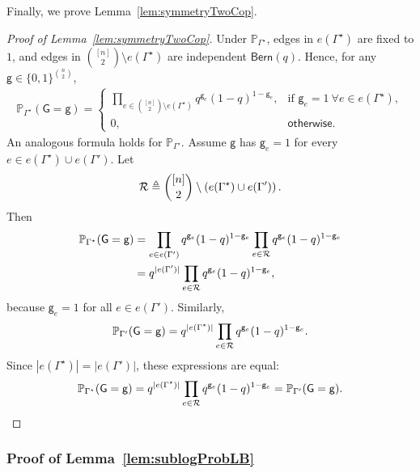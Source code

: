 \documentclass[12pt]{article}
\newcommand {\pr} {\mathbb{P}}
\newcommand{\calR}{{\cal R}}
\newcommand{\p}[1]{\left(#1\right)}
\newcommand{\s}[1]{\mathsf{#1}}
\begin{document}
Finally, we prove Lemma~\ref{lem:symmetryTwoCop}.
\begin{proof}[Proof of Lemma~\ref{lem:symmetryTwoCop}]
Under $\pr_{\Gamma^\star}$, edges in $e(\Gamma^\star)$ are fixed to $1$, and edges in $\binom{[n]}{2}\setminus e(\Gamma^\star)$ are independent $\s{Bern}(q)$. Hence, for any $\s{g}\in\{0,1\}^{\binom{n}{2}}$,
\begin{align}
\pr_{\Gamma^\star}(\s{G}=\s{g})=
\begin{cases}
\prod_{e\in \binom{[n]}{2}\setminus e(\Gamma^\star)} q^{\s{g}_e}(1-q)^{1-\s{g}_e}, & \text{if } \s{g}_e=1\ \forall e\in e(\Gamma^\star),\\
0, & \s{otherwise.}
\end{cases}
\end{align}
An analogous formula holds for $\pr_{\Gamma'}$. Assume $\s{g}$ has $\s{g}_e=1$ for every $e\in e(\Gamma^\star)\cup e(\Gamma')$. Let
\begin{align}
\calR \triangleq \binom{[n]}{2}\setminus\p{e(\Gamma^\star)\cup e(\Gamma')}.
\end{align}
Then
\begin{align}
\pr_{\Gamma^\star}(\s{G}=\s{g})
&= \prod_{e\in e(\Gamma')} q^{\s{g}_e}(1-q)^{1-\s{g}_e}\prod_{e\in \calR} q^{\s{g}_e}(1-q)^{1-\s{g}_e}\\
&= q^{|e(\Gamma')|}\prod_{e\in \calR}q^{\s{g}_e}(1-q)^{1-\s{g}_e},
\end{align}
because $\s{g}_e=1$ for all $e\in e(\Gamma')$. Similarly,
\begin{align}
\pr_{\Gamma'}(\s{G}=\s{g})
= q^{|e(\Gamma^\star)|}\prod_{e\in \calR}q^{\s{g}_e}(1-q)^{1-\s{g}_e}.
\end{align}
Since $|e(\Gamma^\star)|=|e(\Gamma')|$, these expressions are equal:
\begin{align}
\pr_{\Gamma^\star}(\s{G}=\s{g})=q^{|e(\Gamma^\star)|}\prod_{e\in\calR} q^{\s{g}_e}(1-q)^{1-\s{g}_e}
=\pr_{\Gamma'}(\s{G}=\s{g}).
\end{align}
\end{proof}

\subsubsection{Proof of Lemma~\ref{lem:sublogProbLB}}\label{app:GeneralizedExpecTThreshold0}
\end{document}
